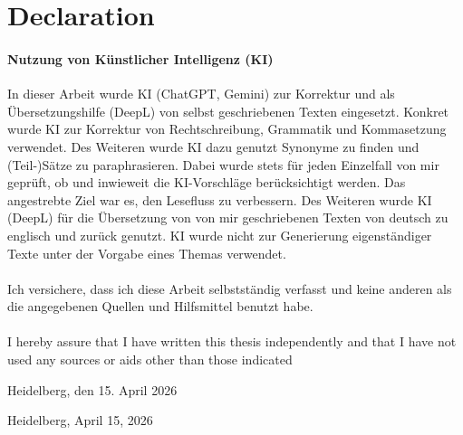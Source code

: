 \chapter{Declaration}

\subsubsection{Nutzung von Künstlicher Intelligenz (KI)}

 In dieser Arbeit wurde KI (ChatGPT, Gemini) zur Korrektur und als Übersetzungshilfe (DeepL) von selbst geschriebenen Texten eingesetzt. Konkret wurde KI zur Korrektur von Rechtschreibung, Grammatik und Kommasetzung verwendet. Des Weiteren wurde KI dazu genutzt Synonyme zu finden und (Teil-)Sätze zu paraphrasieren. Dabei wurde stets für jeden Einzelfall von mir geprüft, ob und inwieweit die KI-Vorschläge berücksichtigt werden. Das angestrebte Ziel war es, den Lesefluss zu verbessern. Des Weiteren wurde KI (DeepL) für die Übersetzung von von mir geschriebenen Texten von deutsch zu englisch und zurück genutzt. KI wurde nicht zur Generierung eigenständiger Texte unter der Vorgabe eines Themas verwendet. 
\\\\
Ich versichere, dass ich diese Arbeit selbstständig verfasst und keine anderen als die angegebenen Quellen und Hilfsmittel benutzt habe.
\\\\
I hereby assure that I have written this thesis independently and that I have not used any sources or aids other than those indicated

\vspace{1cm}

Heidelberg, den 15. April 2026

\vspace{1cm}

Heidelberg, April 15, 2026
